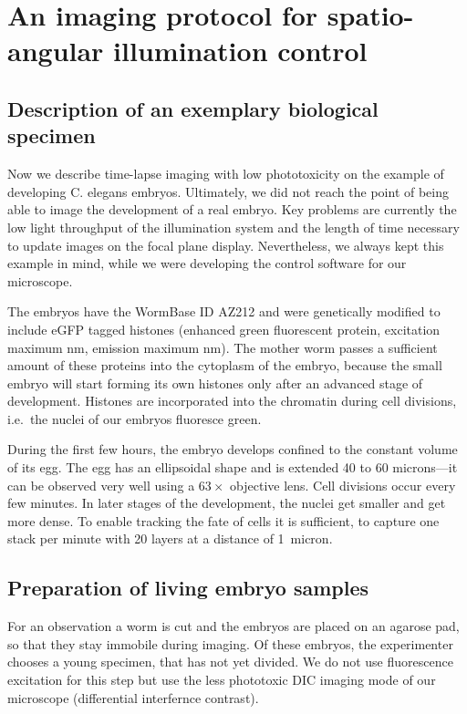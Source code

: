 \section{An imaging protocol for spatio-angular illumination control}
\subsection{Description of an exemplary biological specimen}
Now we describe time-lapse imaging with low phototoxicity on the
example of developing C. elegans embryos. Ultimately, we did not reach
the point of being able to image the development of a real embryo. Key
problems are currently the low light throughput of the illumination
system and the length of time necessary to update images on the focal
plane display. Nevertheless, we always kept this example in mind,
while we were developing the control software for our microscope.

The embryos have the WormBase ID AZ212 and were genetically modified
to include eGFP tagged histones (enhanced green fluorescent protein,
excitation maximum \unit[488]{nm}, emission maximum
\unit[509]{nm}). The mother worm passes a sufficient amount of these
proteins into the cytoplasm of the embryo, because the small embryo
will start forming its own histones only after an advanced stage of
development. Histones are incorporated into the chromatin during cell
divisions, i.e.\ the nuclei of our embryos fluoresce green.

During the first few hours, the embryo develops confined to the
constant volume of its egg. The egg has an ellipsoidal shape and is
extended 40 to 60 microns---it can be observed very well using a
$63\times$ objective lens. Cell divisions occur every few minutes. In
later stages of the development, the nuclei get smaller and get more
dense. To enable tracking the fate of cells it is sufficient, to
capture one stack per minute with 20 layers at a distance of 1~micron.
\subsection{Preparation of living embryo samples}
For an observation a worm is cut and the embryos are placed on an
agarose pad, so that they stay immobile during imaging. Of these
embryos, the experimenter chooses a young specimen, that has not yet
divided. We do not use fluorescence excitation for this step but use
the less phototoxic DIC imaging mode of our microscope (differential
interfernce contrast).

